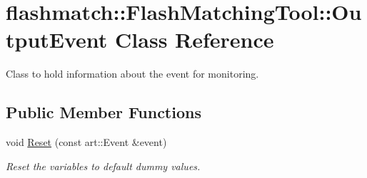 \hypertarget{classflashmatch_1_1FlashMatchingTool_1_1OutputEvent}{\section{flashmatch\-:\-:Flash\-Matching\-Tool\-:\-:Output\-Event Class Reference}
\label{classflashmatch_1_1FlashMatchingTool_1_1OutputEvent}
}


Class to hold information about the event for monitoring.  


\subsection*{Public Member Functions}
\begin{DoxyCompactItemize}
\item 
void \hyperlink{classflashmatch_1_1FlashMatchingTool_1_1OutputEvent_a8c2978d692f26862189e5285c0a5471d}{Reset} (const art\-::\-Event \&event)
\begin{DoxyCompactList}\small\item\em Reset the variables to default dummy values. \end{DoxyCompactList}\end{DoxyCompactItemize}
